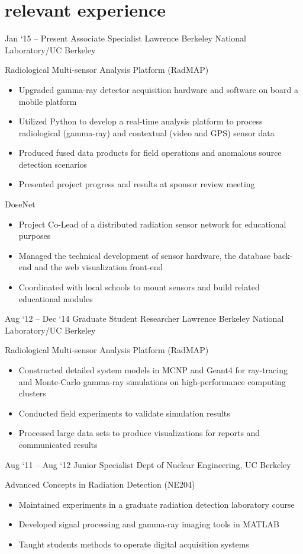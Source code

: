 \documentclass[print]{resume} %
\begin{document}
\section{relevant experience}
\begin{entrylist}
	\entry
		{Jan `15 -- Present}
		{Associate Specialist}
		{Lawrence Berkeley National Laboratory/UC Berkeley}
		{
		Radiological Multi-sensor Analysis Platform (RadMAP)
		\begin{itemize}
			\item Upgraded gamma-ray detector acquisition hardware and software on board a mobile platform
			\item Utilized Python to develop a real-time analysis platform to process radiological (gamma-ray) and contextual (video and GPS) sensor data
			\item Produced fused data products for field operations and anomalous source detection scenarios
			\item Presented project progress and results at sponsor review meeting
		\end{itemize}
		DoseNet
		\begin{itemize}
			\item Project Co-Lead of a distributed radiation sensor network for educational purposes
			\item Managed the technical development of sensor hardware, the database back-end and the web visualization front-end
			\item Coordinated with local schools to mount sensors and build related educational modules
		\end{itemize}
		}
	\entry
		{Aug `12 -- Dec `14}
		{Graduate Student Researcher}
		{Lawrence Berkeley National Laboratory/UC Berkeley}
		{Radiological Multi-sensor Analysis Platform (RadMAP)
		\begin{itemize}
			\item Constructed detailed system models in MCNP and Geant4 for ray-tracing and Monte-Carlo gamma-ray simulations on high-performance computing clusters
			\item Conducted field experiments to validate simulation results
			\item Processed large data sets to produce visualizations for reports and communicated results
		\end{itemize}
		}
	\entry
		{Aug `11 -- Aug `12}
		{Junior Specialist}
		{Dept of Nuclear Engineering, UC Berkeley}
		{Advanced Concepts in Radiation Detection (NE204)
		\begin{itemize}
			\item Maintained experiments in a graduate radiation detection laboratory course
			\item Developed signal processing and gamma-ray imaging tools in MATLAB
			\item Taught students methods to operate digital acquisition systems
		\end{itemize}
		}
\end{entrylist}
\end{document}
